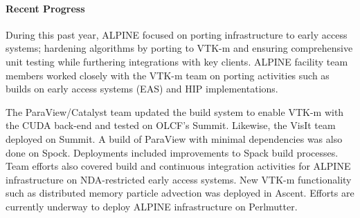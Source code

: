 
\paragraph{Recent Progress}

During this past year, ALPINE focused on porting infrastructure to early access systems; hardening algorithms by porting to VTK-m and ensuring comprehensive unit testing while furthering integrations with key clients.  ALPINE facility team members worked closely with the VTK-m team on porting activities such as builds on early access systems (EAS) and  HIP implementations. 

The ParaView/Catalyst team updated the build system to enable VTK-m with the CUDA back-end and tested on OLCF's Summit.  Likewise, the VisIt team deployed on Summit.  A  build of ParaView with minimal dependencies was also done on Spock.  Deployments included improvements to Spack build processes.   Team efforts also covered build and continuous integration activities for ALPINE infrastructure on NDA-restricted early access systems.   New VTK-m functionality such as distributed memory particle advection was deployed in Ascent.   Efforts are currently underway to deploy ALPINE infrastructure on Perlmutter.   



